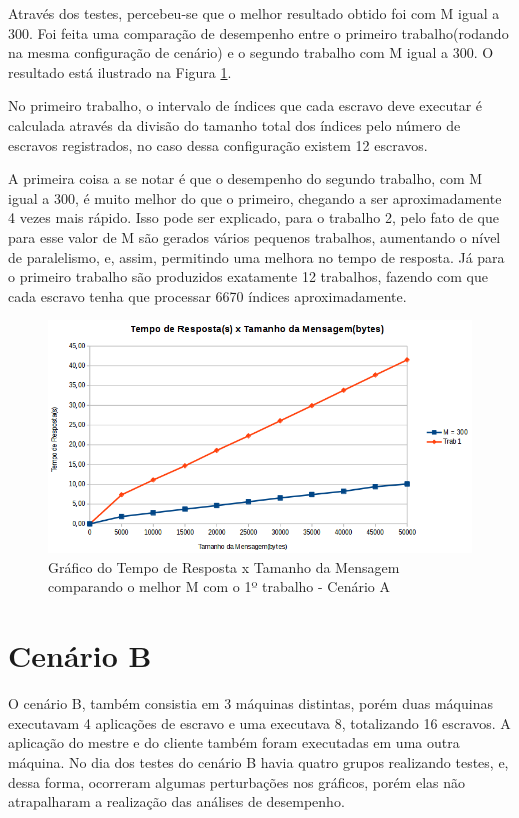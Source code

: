 \documentclass[
	12pt,				%
    oneside,			%
	a4paper,			%
	english,			%
	brazil,				%
	]{abntex2}
\begin{document}

Através dos testes, percebeu-se que o melhor resultado obtido foi com M igual a 300. Foi feita uma comparação de desempenho entre o primeiro trabalho(rodando na mesma configuração de cenário) e o segundo trabalho com M igual a 300. O resultado está ilustrado na Figura \ref{fig:tempo_respostaXtamanho_msg_A_T1}.

No primeiro trabalho, o intervalo de índices que cada escravo deve executar é calculada através da divisão do tamanho total dos índices pelo número de escravos registrados, no caso dessa configuração existem 12 escravos. 

A primeira coisa a se notar é que o desempenho do segundo trabalho, com M igual a 300, é muito melhor do que o primeiro, chegando a ser aproximadamente 4 vezes mais rápido. Isso pode ser explicado, para o trabalho 2, pelo fato de que para esse valor de M são gerados vários pequenos trabalhos, aumentando o nível de paralelismo, e, assim, permitindo uma melhora no tempo de resposta. Já para o primeiro trabalho são produzidos exatamente 12 trabalhos, fazendo com que cada escravo tenha que processar 6670 índices aproximadamente.

\begin{figure}[!htb]
\centering
\includegraphics[scale=0.7]{figuras/A_T1.png}
\caption{Gráfico do Tempo de Resposta x Tamanho da Mensagem comparando o melhor M com o 1º trabalho - Cenário A}
\label{fig:tempo_respostaXtamanho_msg_A_T1}
\end{figure}

\section{Cenário B}
O cenário B, também consistia em 3 máquinas distintas, porém duas máquinas executavam 4 aplicações de escravo e uma executava 8, totalizando 16 escravos. A aplicação do mestre e do cliente também foram executadas em uma outra máquina. No dia dos testes do cenário B havia quatro grupos realizando testes, e, dessa forma, ocorreram algumas perturbações nos gráficos, porém elas não atrapalharam a realização das análises de desempenho.
\end{document}
